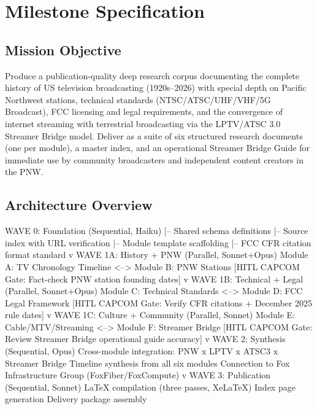 \documentclass[11pt,letterpaper]{article}
\newcommand{\stageheader}[2]{%
  \noindent\colorbox{#2}{\makebox[\textwidth][l]{%
    \textcolor{white}{\bfseries\sffamily\hspace{6pt}#1\hspace{6pt}}}}%
  \vspace{0.5em}\par%
}
\begin{document}
\newpage

\stageheader{STAGE 3 --- MISSION PACKAGE}{tertiary}

\section{Milestone Specification}

\subsection{Mission Objective}

Produce a publication-quality deep research corpus documenting the complete history of US television broadcasting (1920s--2026) with special depth on Pacific Northwest stations, technical standards (NTSC/ATSC/UHF/VHF/5G Broadcast), FCC licensing and legal requirements, and the convergence of internet streaming with terrestrial broadcasting via the LPTV/ATSC 3.0 Streamer Bridge model. Deliver as a suite of six structured research documents (one per module), a master index, and an operational Streamer Bridge Guide for immediate use by community broadcasters and independent content creators in the PNW.

\subsection{Architecture Overview}

\begin{asciibox}
WAVE 0: Foundation (Sequential, Haiku)
  |-- Shared schema definitions
  |-- Source index with URL verification
  |-- Module template scaffolding
  |-- FCC CFR citation format standard
  v
WAVE 1A: History + PNW (Parallel, Sonnet+Opus)
  Module A: TV Chronology Timeline  <-->  Module B: PNW Stations
  [HITL CAPCOM Gate: Fact-check PNW station founding dates]
  v
WAVE 1B: Technical + Legal (Parallel, Sonnet+Opus)
  Module C: Technical Standards   <-->  Module D: FCC Legal Framework
  [HITL CAPCOM Gate: Verify CFR citations + December 2025 rule dates]
  v
WAVE 1C: Culture + Community (Parallel, Sonnet)
  Module E: Cable/MTV/Streaming   <-->  Module F: Streamer Bridge
  [HITL CAPCOM Gate: Review Streamer Bridge operational guide accuracy]
  v
WAVE 2: Synthesis (Sequential, Opus)
  Cross-module integration: PNW x LPTV x ATSC3 x Streamer Bridge
  Timeline synthesis from all six modules
  Connection to Fox Infrastructure Group (FoxFiber/FoxCompute)
  v
WAVE 3: Publication (Sequential, Sonnet)
  LaTeX compilation (three passes, XeLaTeX)
  Index page generation
  Delivery package assembly
\end{asciibox}
\end{document}
